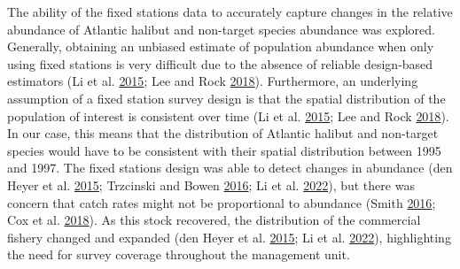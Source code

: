 \documentclass[12pt]{article}\usepackage[]{graphicx}\usepackage[]{color}
\begin{document}
The ability of the fixed stations data to accurately capture changes in the relative abundance of Atlantic halibut and non-target species abundance was explored. Generally, obtaining an unbiased estimate of population abundance when only using fixed stations is very difficult due to the absence of reliable design-based estimators (Li et al. \protect\hyperlink{ref-Li2015}{2015}; Lee and Rock \protect\hyperlink{ref-Lee2018}{2018}). Furthermore, an underlying assumption of a fixed station survey design is that the spatial distribution of the population of interest is consistent over time (Li et al. \protect\hyperlink{ref-Li2015}{2015}; Lee and Rock \protect\hyperlink{ref-Lee2018}{2018}). In our case, this means that the distribution of Atlantic halibut and non-target species would have to be consistent with their spatial distribution between 1995 and 1997. The fixed stations design was able to detect changes in abundance (den Heyer et al. \protect\hyperlink{ref-DenHeyer2015}{2015}; Trzcinski and Bowen \protect\hyperlink{ref-Trzcinski2016}{2016}; Li et al. \protect\hyperlink{ref-Li2022}{2022}), but there was concern that catch rates might not be proportional to abundance (Smith \protect\hyperlink{ref-Smith2016a}{2016}; Cox et al. \protect\hyperlink{ref-Cox2018}{2018}). As this stock recovered, the distribution of the commercial fishery changed and expanded (den Heyer et al. \protect\hyperlink{ref-DenHeyer2015}{2015}; Li et al. \protect\hyperlink{ref-Li2022}{2022}), highlighting the need for survey coverage throughout the management unit.
\end{document}
